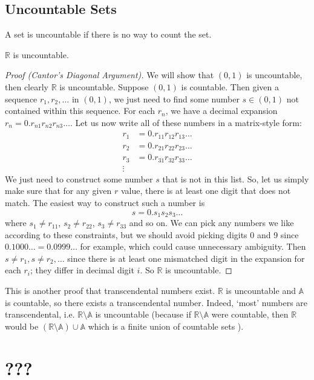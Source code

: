 \documentclass{article}
\begin{document}
\subsection{Uncountable Sets}
\begin{definition}
	A set is uncountable if there is no way to count the set.
\end{definition}
\begin{theorem}
	$\mathbb R$ is uncountable.
\end{theorem}
\begin{proof}[Proof (Cantor's Diagonal Argument)]
	We will show that $(0, 1)$ is uncountable, then clearly $\mathbb R$ is uncountable. Suppose $(0, 1)$ is countable. Then given a sequence $r_1, r_2, \dots$ in $(0, 1)$, we just need to find some number $s \in (0, 1)$ not contained within this sequence. For each $r_n$, we have a decimal expansion $r_n = 0.r_{n1}r_{n2}r_{n3}\dots$. Let us now write all of these numbers in a matrix-style form:
	\begin{align*}
		r_1 & = 0.r_{11}r_{12}r_{13}\dots \\
		r_2 & = 0.r_{21}r_{22}r_{23}\dots \\
		r_3 & = 0.r_{31}r_{32}r_{33}\dots \\
		\vdots
	\end{align*}
	We just need to construct some number $s$ that is not in this list. So, let us simply make sure that for any given $r$ value, there is at least one digit that does not match. The easiest way to construct such a number is
	\[ s = 0.s_1 s_2 s_3 \dots \]
	where $s_1 \neq r_{11}$, $s_2 \neq r_{22}$, $s_3 \neq r_{33}$ and so on. We can pick any numbers we like according to these constraints, but we should avoid picking digits 0 and 9 since $0.1000\dots = 0.0999\dots$ for example, which could cause unnecessary ambiguity. Then $s \neq r_1, s \neq r_2, \dots$ since there is at least one mismatched digit in the expansion for each $r_i$; they differ in decimal digit $i$. So $\mathbb R$ is uncountable.
\end{proof}
This is another proof that transcendental numbers exist. $\mathbb R$ is uncountable and $\mathbb A$ is countable, so there exists a transcendental number. Indeed, `most' numbers are transcendental, i.e. $\mathbb R \setminus \mathbb A$ is uncountable (because if $\mathbb R \setminus \mathbb A$ were countable, then $\mathbb R$ would be $(\mathbb R \setminus \mathbb A) \cup \mathbb A$ which is a finite union of countable sets \contradiction).

\section{???}
\end{document}
